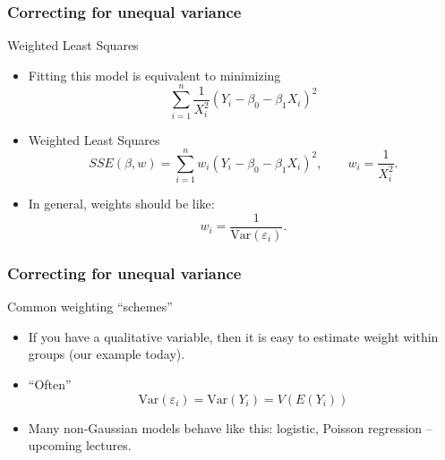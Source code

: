 \documentclass[handout]{beamer}
\begin{document}

   \begin{frame} \frametitle{Correcting for unequal variance}

   \begin{block}
   {Weighted Least Squares}

   \begin{itemize}

   \item Fitting this model is equivalent to minimizing
   $$
   \sum_{i=1}^n \frac{1}{X_i^2} \left(Y_i - \beta_0 - \beta_1 X_i\right)^2
   $$
   \item Weighted Least Squares
   $$
   SSE(\beta, w) = \sum_{i=1}^n w_i \left(Y_i - \beta_0 - \beta_1 X_i\right)^2, \qquad w_i = \frac{1}{X_i^2}.
   $$

   \item In general, weights should be
     like:
   $$
   w_i = \frac{1}{\text{Var}(\varepsilon_i)}.$$
   \end{itemize}
   \end{block}
   \end{frame}


   \begin{frame} \frametitle{Correcting for unequal variance}

   \begin{block}
   {Common weighting ``schemes''}
   \begin{itemize}

   \item If you have a qualitative variable, then it is easy to
   estimate weight within groups (our example today).

   \item ``Often''
   $$
   \text{Var}(\varepsilon_i) = \text{Var}(Y_i) = V(E(Y_i))$$

   \item Many non-Gaussian models behave like this: logistic, Poisson regression -- upcoming lectures.

   \end{itemize}

   \end{block}
   \end{frame}

\end{document}
